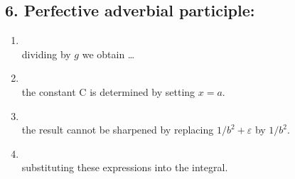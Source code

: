 \subsection*{6. Perfective adverbial participle: }

\begin{enumerate}[label=6.\arabic*)]
\item {}\\
      dividing by $g$ we obtain \ldots
\item {}\\
      the constant C is determined by setting $x=a$.
\item {}\\
      the result cannot be sharpened by replacing $1/b^2+\varepsilon$ by $1/b^2$.
\item {}\\
      substituting these expressions into the integral.
\end{enumerate}
\endgroup
\fussy